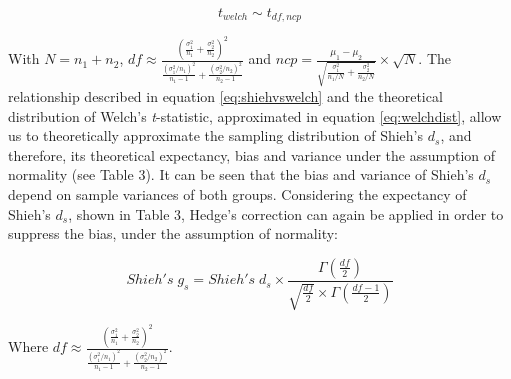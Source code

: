 \documentclass[
  man,floatsintext]{apa6}
\begin{document}
\begin{equation} 
t_{welch} \sim t_{df,ncp}
\label{eq:welchdist}
\end{equation}

With \(N = n_1+n_2\), \(df \approx \frac{\left(\frac{\sigma^2_1}{n_1}+\frac{\sigma^2_2}{n_2} \right)^2}{\frac{(\sigma^2_1/n_1)^2}{n_1-1}+\frac{(\sigma^2_2/n_2)^2}{n_2-1}}\) and \(ncp = \frac{\mu_1-\mu_2}{\sqrt{\frac{\sigma_1^2}{n_1/N}+\frac{\sigma_2^2}{n_2/N}}} \times \sqrt{N}\). The relationship described in equation \ref{eq:shiehvswelch} and the theoretical distribution of Welch's \emph{t}-statistic, approximated in equation \ref{eq:welchdist}, allow us to theoretically approximate the sampling distribution of Shieh's \(d_s\), and therefore, its theoretical expectancy, bias and variance under the assumption of normality (see Table 3). It can be seen that the bias and variance of Shieh's \(d_s\) depend on sample variances of both groups. Considering the expectancy of Shieh's \(d_s\), shown in Table 3, Hedge's correction can again be applied in order to suppress the bias, under the assumption of normality:

\begin{equation} 
Shieh's \; g_s = Shieh's \; d_s \times \frac{\Gamma(\frac{df}{2})}{\sqrt{\frac{df}{2}} \times \Gamma(\frac{df-1}{2})}
\label{eq:Hedgesgs}
\end{equation}

Where \(df \approx \frac{\left(\frac{\sigma^2_1}{n_1}+\frac{\sigma^2_2}{n_2} \right)^2}{\frac{(\sigma^2_1/n_1)^2}{n_1-1}+\frac{(\sigma^2_2/n_2)^2}{n_2-1}}\).
\end{document}
